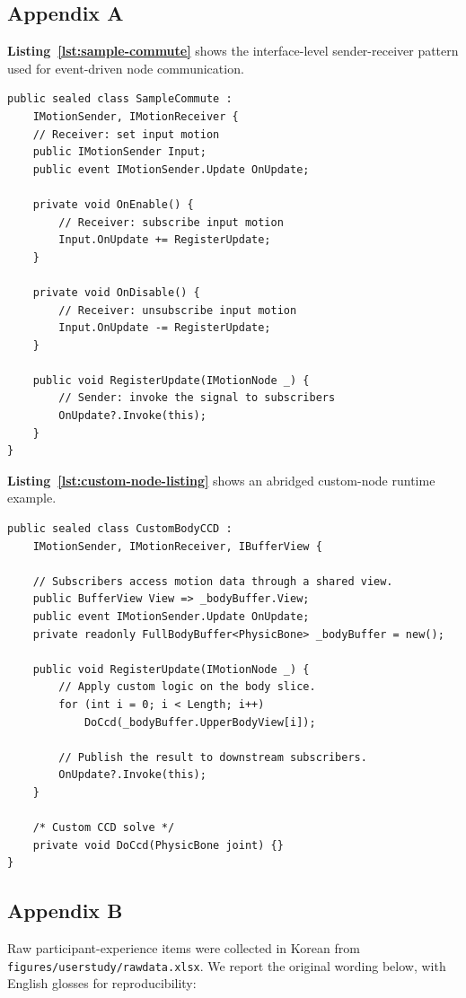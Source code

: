 \subsection{Appendix A}\label{sec:appendix-code}

{\bf Listing~\ref{lst:sample-commute}} shows the interface-level sender-receiver
pattern used for event-driven node communication.
\begin{lstlisting}[style=csharpstyle,caption={Interface-level sender-receiver pattern for event-driven node communication.},label={lst:sample-commute}]
public sealed class SampleCommute :
    IMotionSender, IMotionReceiver {
    // Receiver: set input motion
    public IMotionSender Input;
    public event IMotionSender.Update OnUpdate;

    private void OnEnable() {
        // Receiver: subscribe input motion
        Input.OnUpdate += RegisterUpdate;
    }

    private void OnDisable() {
        // Receiver: unsubscribe input motion
        Input.OnUpdate -= RegisterUpdate;
    }

    public void RegisterUpdate(IMotionNode _) {
        // Sender: invoke the signal to subscribers
        OnUpdate?.Invoke(this);
    }
}
\end{lstlisting}

{\bf Listing~\ref{lst:custom-node-listing}} shows an abridged custom-node runtime
example.
\begin{lstlisting}[style=csharpstyle,caption={Abridged custom-node runtime example.},label={lst:custom-node-listing}]
public sealed class CustomBodyCCD :
    IMotionSender, IMotionReceiver, IBufferView {

    // Subscribers access motion data through a shared view.
    public BufferView View => _bodyBuffer.View;
    public event IMotionSender.Update OnUpdate;
    private readonly FullBodyBuffer<PhysicBone> _bodyBuffer = new();

    public void RegisterUpdate(IMotionNode _) {
        // Apply custom logic on the body slice.
        for (int i = 0; i < Length; i++)
            DoCcd(_bodyBuffer.UpperBodyView[i]);

        // Publish the result to downstream subscribers.
        OnUpdate?.Invoke(this);
    }

    /* Custom CCD solve */
    private void DoCcd(PhysicBone joint) {}
}
\end{lstlisting}

\subsection{Appendix B}\label{sec:appendix-userstudy-instrument}
Raw participant-experience items were collected in Korean from
\texttt{figures/userstudy/rawdata.xlsx}. We report the original wording below,
with English glosses for reproducibility:

